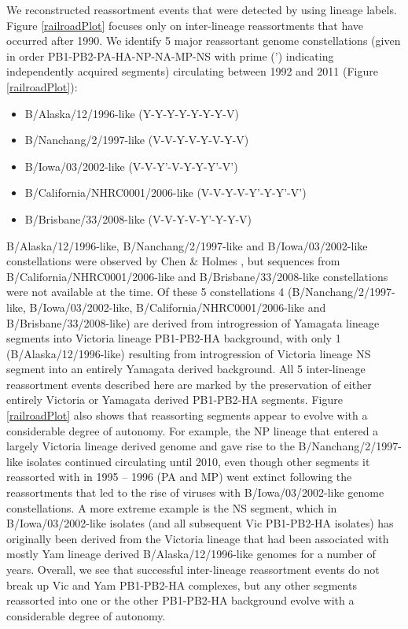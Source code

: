 \documentclass[11pt,oneside,letterpaper]{article}
\begin{document}
We reconstructed reassortment events that were detected by using lineage labels.
Figure \ref{railroadPlot} focuses only on inter-lineage reassortments that have occurred after 1990.
We identify 5 major reassortant genome constellations (given in order PB1-PB2-PA-HA-NP-NA-MP-NS with prime (') indicating independently acquired segments) circulating between 1992 and 2011 (Figure \ref{railroadPlot}):
\begin{itemize}
  \item B/Alaska/12/1996-like (Y-Y-Y-Y-Y-Y-Y-V)
  \item B/Nanchang/2/1997-like (V-V-Y-V-Y-V-Y-V)
  \item B/Iowa/03/2002-like (V-V-Y'-V-Y-Y-Y'-V')
  \item B/California/NHRC0001/2006-like (V-V-Y-V-Y'-Y-Y'-V')
  \item B/Brisbane/33/2008-like (V-V-Y-V-Y'-Y-Y-V)
\end{itemize}
B/Alaska/12/1996-like, B/Nanchang/2/1997-like and B/Iowa/03/2002-like constellations were observed by Chen \& Holmes \cite{chen2008}, but sequences from B/California/NHRC0001/2006-like and B/Brisbane/33/2008-like constellations were not available at the time.
Of these 5 constellations 4 (B/Nanchang/2/1997-like, B/Iowa/03/2002-like, B/California/NHRC0001/2006-like and B/Brisbane/33/2008-like) are derived from introgression of Yamagata lineage segments into Victoria lineage PB1-PB2-HA background, with only 1 (B/Alaska/12/1996-like) resulting from introgression of Victoria lineage NS segment into an entirely Yamagata derived background.
All 5 inter-lineage reassortment events described here are marked by the preservation of either entirely Victoria or Yamagata derived PB1-PB2-HA segments.
Figure \ref{railroadPlot} also shows that reassorting segments appear to evolve with a considerable degree of autonomy.
For example, the NP lineage that entered a largely Victoria lineage derived genome and gave rise to the B/Nanchang/2/1997-like isolates continued circulating until 2010, even though other segments it reassorted with in 1995 -- 1996 (PA and MP) went extinct following the reassortments that led to the rise of viruses with B/Iowa/03/2002-like genome constellations.
A more extreme example is the NS segment, which in B/Iowa/03/2002-like isolates (and all subsequent Vic PB1-PB2-HA isolates) has originally been derived from the Victoria lineage that had been associated with mostly Yam lineage derived B/Alaska/12/1996-like genomes for a number of years.
Overall, we see that successful inter-lineage reassortment events do not break up Vic and Yam PB1-PB2-HA complexes, but any other segments reassorted into one or the other PB1-PB2-HA background evolve with a considerable degree of autonomy.
\end{document}
